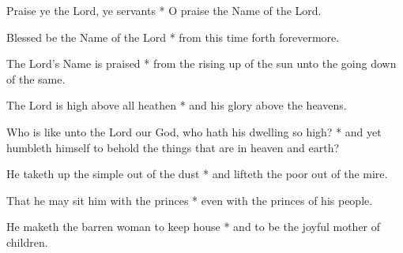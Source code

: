 Praise ye the Lord, ye servants * O praise the Name of the Lord.

Blessed be the Name of the Lord * from this time forth forevermore.
	
The Lord's Name is praised * from the rising up of the sun unto the going down of the same.
	
The Lord is high above all heathen * and his glory above the heavens.
	
Who is like unto the Lord our God, who hath his dwelling so high? * and yet humbleth himself to behold the things that are in heaven and earth?
	
He taketh up the simple out of the dust * and lifteth the poor out of the mire.
	
That he may sit him with the princes * even with the princes of his people.
	
He maketh the barren woman to keep house * and to be the joyful mother of children.